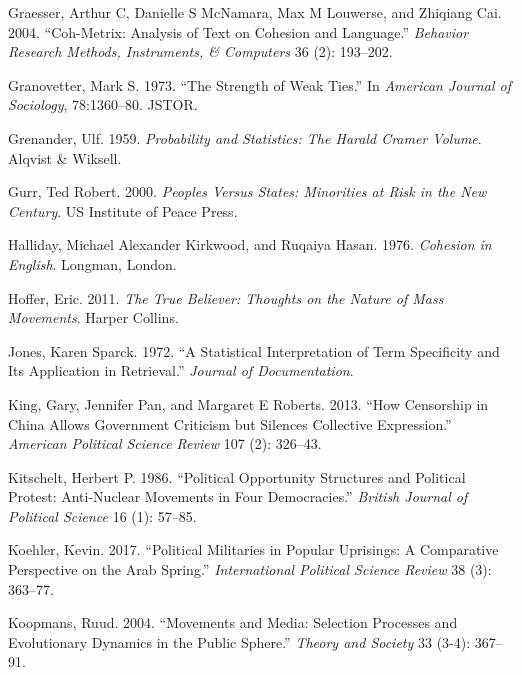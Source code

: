 \documentclass[english,man]{apa6}
\begin{document}
\leavevmode\hypertarget{ref-graesser2004coh}{}%
Graesser, Arthur C, Danielle S McNamara, Max M Louwerse, and Zhiqiang Cai. 2004. ``Coh-Metrix: Analysis of Text on Cohesion and Language.'' \emph{Behavior Research Methods, Instruments, \& Computers} 36 (2): 193--202.

\leavevmode\hypertarget{ref-granovetter1977strength}{}%
Granovetter, Mark S. 1973. ``The Strength of Weak Ties.'' In \emph{American Journal of Sociology}, 78:1360--80. JSTOR.

\leavevmode\hypertarget{ref-grenander1959probability}{}%
Grenander, Ulf. 1959. \emph{Probability and Statistics: The Harald Cramer Volume}. Alqvist \& Wiksell.

\leavevmode\hypertarget{ref-gurr2000peoples}{}%
Gurr, Ted Robert. 2000. \emph{Peoples Versus States: Minorities at Risk in the New Century}. US Institute of Peace Press.

\leavevmode\hypertarget{ref-halliday1976cohesion}{}%
Halliday, Michael Alexander Kirkwood, and Ruqaiya Hasan. 1976. \emph{Cohesion in English}. Longman, London.

\leavevmode\hypertarget{ref-Hoffer2011true}{}%
Hoffer, Eric. 2011. \emph{The True Believer: Thoughts on the Nature of Mass Movements}. Harper Collins.

\leavevmode\hypertarget{ref-jones1972statistical}{}%
Jones, Karen Sparck. 1972. ``A Statistical Interpretation of Term Specificity and Its Application in Retrieval.'' \emph{Journal of Documentation}.

\leavevmode\hypertarget{ref-king2013censorship}{}%
King, Gary, Jennifer Pan, and Margaret E Roberts. 2013. ``How Censorship in China Allows Government Criticism but Silences Collective Expression.'' \emph{American Political Science Review} 107 (2): 326--43.

\leavevmode\hypertarget{ref-kitschelt1986political}{}%
Kitschelt, Herbert P. 1986. ``Political Opportunity Structures and Political Protest: Anti-Nuclear Movements in Four Democracies.'' \emph{British Journal of Political Science} 16 (1): 57--85.

\leavevmode\hypertarget{ref-koehler2017political}{}%
Koehler, Kevin. 2017. ``Political Militaries in Popular Uprisings: A Comparative Perspective on the Arab Spring.'' \emph{International Political Science Review} 38 (3): 363--77.

\leavevmode\hypertarget{ref-koopmans2004movements}{}%
Koopmans, Ruud. 2004. ``Movements and Media: Selection Processes and Evolutionary Dynamics in the Public Sphere.'' \emph{Theory and Society} 33 (3-4): 367--91.
\end{document}
